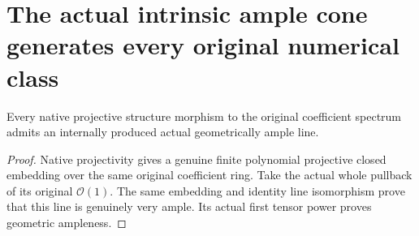\section{The actual intrinsic ample cone generates every original numerical class}
\label{sec:native-numerical-ample-cone-generation}

\begin{lemma}
\label{lem:native-projectivity-geometric-ample-line}
\leanok
{}
Every native projective structure morphism to the original coefficient
spectrum admits an internally produced actual geometrically ample line.
\end{lemma}
\begin{proof}
Native projectivity gives a genuine finite polynomial projective closed
embedding over the same original coefficient ring. Take the actual
whole pullback of its original $\mathcal O(1)$. The same embedding and
identity line isomorphism prove that this line is genuinely very ample.
Its actual first tensor power proves geometric ampleness.
\end{proof}

